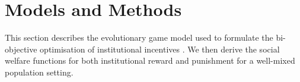 \documentclass{article}
\begin{document}



\section{Models and Methods}
\label{sec: models and methods}
This section describes the evolutionary game model used to formulate the bi-objective optimisation of institutional incentives \cite{duonghan2021cost,han2018interference}. We then derive the social welfare functions for both institutional reward and punishment for a well-mixed population setting.
\end{document}
